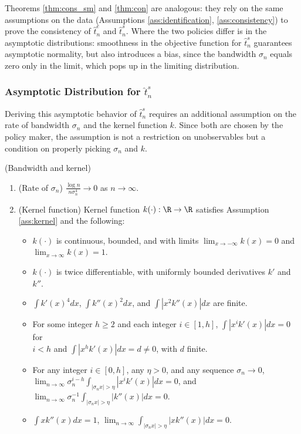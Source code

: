 {Theorems \ref{thm:cons_sm} and \ref{thm:con} are analogous: they rely on the same assumptions on the data (Assumptions \ref{ass:identification}, \ref{ass:consistency}) to prove the consistency of $\hat{t}^e_n$ and $\hat{t}^s_n$. Where the two policies differ is in the asymptotic distributions: smoothness in the objective function for $\hat{t}^s_n$ guarantees asymptotic normality, but also introduces a bias, since the bandwidth $\sigma_n$ equals zero only in the limit, which pops up in the limiting distribution.

\subsubsection{Asymptotic Distribution for $\hat{t}^s_n$}

Deriving this asymptotic behavior of $\hat{t}^s_n$ requires an additional assumption on the rate of bandwidth $\sigma_n$ and the kernel function $k$. Since both are chosen by the policy maker, the assumption is not a restriction on unobservables but a condition on properly picking $\sigma_n$ and $k$.

\begin{ass} \label{ass:asymptotic_sm}
{\normalfont (Bandwidth and kernel)} 
\begin{enumerate}[label=5.\arabic*]
\item \label{ass:rateofs}
    {\normalfont (Rate of $\sigma_n$)} $\frac{\log n}{n \sigma_n^4} \rightarrow 0$ as $n\rightarrow \infty$.
\item \label{ass:extraonk}
   {\normalfont (Kernel function)} Kernel function $k(\cdot): \R \rightarrow \R$ satisfies Assumption \ref{ass:kernel} and the following:
     \begin{itemize}
         \item $k(\cdot)$ is continuous, bounded, and with limits $\lim_{x \rightarrow - \infty} k(x) = 0$ and $\lim_{x \rightarrow \infty} k(x) = 1$.
         \item $k(\cdot)$ is twice differentiable, with uniformly bounded derivatives $k'$ and $k''$.
         \item $\int k'(x)^4 dx$, $\int k''(x)^2 dx$, and $\int |x^2 k''(x)| dx$ are finite.
         \item For some integer $h \geq 2$ and each integer $i\in[1,h]$, $\int |x^i k'(x)| dx =0$ for \\ $i<h$ and $\int |x^h k'(x)| dx =d \neq 0$, with $d$ finite.
         \item For any integer $i \in [0,h]$, any $\eta >0$, and any sequence $\sigma_n \rightarrow 0$, \\ $\lim_{n\rightarrow \infty} \sigma_n^{i-h} \int_{|\sigma_n x| > \eta} | x^i k'(x)| dx = 0$, and $\lim_{n\rightarrow \infty} \sigma_n^{-1} \int_{|\sigma_n x| > \eta} | k''(x)| dx = 0$.
         \item $\int x k''(x) dx = 1$, $\lim_{n\rightarrow \infty}  \int_{|\sigma_n x| > \eta} | x k''(x)| dx = 0$.
     \end{itemize} 
\end{enumerate}
\end{ass}

}
